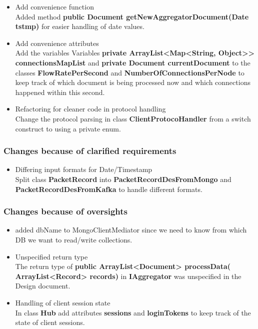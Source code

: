 \documentclass[oneside, english, final]{design}
\begin{document}
\begin{itemize}
  \item{Add convenience function}
    \\
    Added method \textsf{\textbf{public Document getNewAggregatorDocument(Date tstmp)}} for easier handling of date values.

    
  \item{Add convenience attributes}
    \\
    Add the variables Variables
    \textsf{\textbf{private ArrayList<Map<String, Object>> connectionsMapList}} and
    \textsf{\textbf{private Document currentDocument}} to the classes \textsf{\textbf{FlowRatePerSecond}} and \textsf{\textbf{NumberOfConnectionsPerNode}} to
    keep track of which document is being processed now and which connections happened within this second.
    

\item{Refactoring for cleaner code in protocol handling}
  \\
  Change the protocol parsing in class \textsf{\textbf{ClientProtocoHandler}} from a switch construct to using a private enum.

\end{itemize}

\subsubsection{Changes because of clarified requirements}
\begin{itemize}
\item{Differing input formats for Date/Timestamp}
  \\
  Split class \textsf{\textbf{PacketRecord}} into \textsf{\textbf{PacketRecordDesFromMongo}} and \textsf{\textbf{PacketRecordDesFromKafka}} to handle different formats.

\end{itemize}


\subsubsection{Changes because of oversights}

\begin{itemize}
  \item{added dbName to MongoClientMediator since we need to know from which DB we want to read/write collections.}
\\


  \item{Unspecified return type}
    \\
    The return type of \textsf{\textbf{public ArrayList<Document> processData( ArrayList<Record> records)}} in \textsf{\textbf{IAggregator}}
was unspecified in the Design document.

  \item{Handling of client session state}
    \\
    In class \textsf{\textbf{Hub}} add attributes \textsf{\textbf{sessions}} and \textsf{\textbf{loginTokens}} to keep track of the state of client sessions.

\end{itemize}
\end{document}
